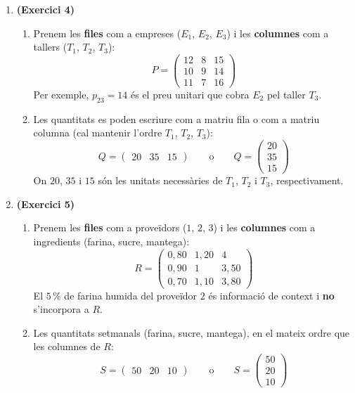 \documentclass[12pt,a4paper]{article}
\newcommand{\blocInici}{%
  \par\nobreak\vspace{0pt}%
  \begin{minipage}[t]{\linewidth}%
}
\newcommand{\blocFi}{%
  \end{minipage}%
  \par
}
\begin{document}
\begin{enumerate}[leftmargin=*,itemsep=0.85em,parsep=0.25em]
\item
{}%
\blocInici
\textbf{(Exercici 4)}
\begin{enumerate}[label=\alph*),leftmargin=1.2em,itemsep=0.35em]
  \item Prenem les \textbf{files} com a empreses ($E_1$, $E_2$, $E_3$)
    i les \textbf{columnes} com a tallers ($T_1$, $T_2$, $T_3$):
    \[
      P =
      \begin{pmatrix}
        12 & 8 & 15 \\
        10 & 9 & 14 \\
        11 & 7 & 16
      \end{pmatrix}
    \]
    Per exemple, $p_{23}=14$ és el preu unitari que cobra $E_2$ pel taller $T_3$.
  \item Les quantitats es poden escriure com a matriu fila o com a matriu columna
    (cal mantenir l'ordre $T_1$, $T_2$, $T_3$):
    \[
      Q =
      \begin{pmatrix} 20 & 35 & 15 \end{pmatrix}
      \qquad\text{o}\qquad
      Q =
      \begin{pmatrix} 20 \\ 35 \\ 15 \end{pmatrix}
    \]
    On $20$, $35$ i $15$ són les unitats necessàries de $T_1$, $T_2$ i $T_3$, respectivament.
\end{enumerate}
\blocFi

\item
{}%
\blocInici
\textbf{(Exercici 5)}
\begin{enumerate}[label=\alph*),leftmargin=1.2em,itemsep=0.35em]
  \item Prenem les \textbf{files} com a proveïdors ($1$, $2$, $3$)
    i les \textbf{columnes} com a ingredients (farina, sucre, mantega):
    \[
      R =
      \begin{pmatrix}
        0{,}80 & 1{,}20 & 4 \\
        0{,}90 & 1 & 3{,}50 \\
        0{,}70 & 1{,}10 & 3{,}80
      \end{pmatrix}
    \]
    El $5\,\%$ de farina humida del proveïdor $2$ és informació de context
    i \textbf{no} s'incorpora a $R$.
  \item Les quantitats setmanals (farina, sucre, mantega), en el mateix ordre que les columnes de $R$:
    \[
      S =
      \begin{pmatrix} 50 & 20 & 10 \end{pmatrix}
      \qquad\text{o}\qquad
      S =
      \begin{pmatrix} 50 \\ 20 \\ 10 \end{pmatrix}
    \]
\end{enumerate}
\blocFi

\end{enumerate}
\end{document}
